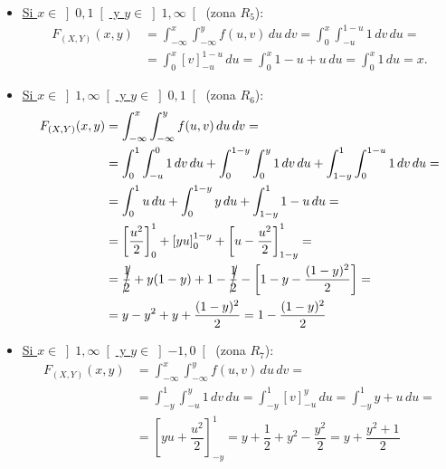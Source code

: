 \begin{ejercicio}
\begin{enumerate}
\begin{itemize}
            \item \ul{Si $x\in \left]0,1\right[$ \quad y \quad $y\in \left]1,\infty\right[$} (zona $R_5$):
            \begin{align*}
                F_{(X,Y)}(x, y) &= \int_{-\infty}^x \int_{-\infty}^y f(u, v) \, du \, dv
                = \int_{0}^{x} \int_{-u}^{1-u} 1 \, dv \, du
                =\\&= \int_{0}^{x} \left[v\right]_{-u}^{1-u} \, du
                = \int_{0}^{x} 1-u+u \, du
                = \int_{0}^{x} 1 \, du = x.
            \end{align*}

            \item \ul{Si $x\in \left]1,\infty\right[$ \quad y \quad $y\in \left]0,1\right[$} (zona $R_6$):
            \begin{align*}
                F_{(X,Y)}(x, y) &= \int_{-\infty}^x \int_{-\infty}^y f(u, v) \, du \, dv
                =\\&= \int_{0}^{1} \int_{-u}^{0} 1 \, dv \, du
                + \int_{0}^{1-y} \int_{0}^{y} 1 \, dv \, du
                + \int_{1-y}^{1} \int_{0}^{1-u} 1 \, dv \, du
                =\\&= \int_{0}^{1} u \, du
                + \int_{0}^{1-y} y \, du
                + \int_{1-y}^{1} 1-u \, du
                =\\&= \left[\dfrac{u^2}{2}\right]_0^1
                + \left[yu\right]_0^{1-y}
                + \left[u-\dfrac{u^2}{2}\right]_{1-y}^1
                =\\&= \cancel{\dfrac{1}{2}}+y(1-y)+1-\cancel{\dfrac{1}{2}}-\left[1-y-\dfrac{(1-y)^2}{2}\right]
                =\\&= y-y^2+y +\dfrac{(1-y)^2}{2}
                = 1-\dfrac{(1-y)^2}{2}
            \end{align*}

            \item \ul{Si $x\in \left]1,\infty\right[$ \quad y \quad $y\in \left]-1,0\right[$} (zona $R_7$):
            \begin{align*}
                F_{(X,Y)}(x, y) &= \int_{-\infty}^x \int_{-\infty}^y f(u, v) \, du \, dv
                =\\&= \int_{-y}^{1} \int_{-u}^{y} 1 \, dv \, du
                = \int_{-y}^{1} \left[v\right]_{-u}^{y} \, du
                = \int_{-y}^{1} y+u \, du
                =\\&= \left[yu+\dfrac{u^2}{2}\right]_{-y}^1
                = y+\dfrac{1}{2} + y^2-\dfrac{y^2}{2}
                = y+\dfrac{y^2+1}{2}
            \end{align*}


\end{itemize}
\end{enumerate}
\end{ejercicio}
